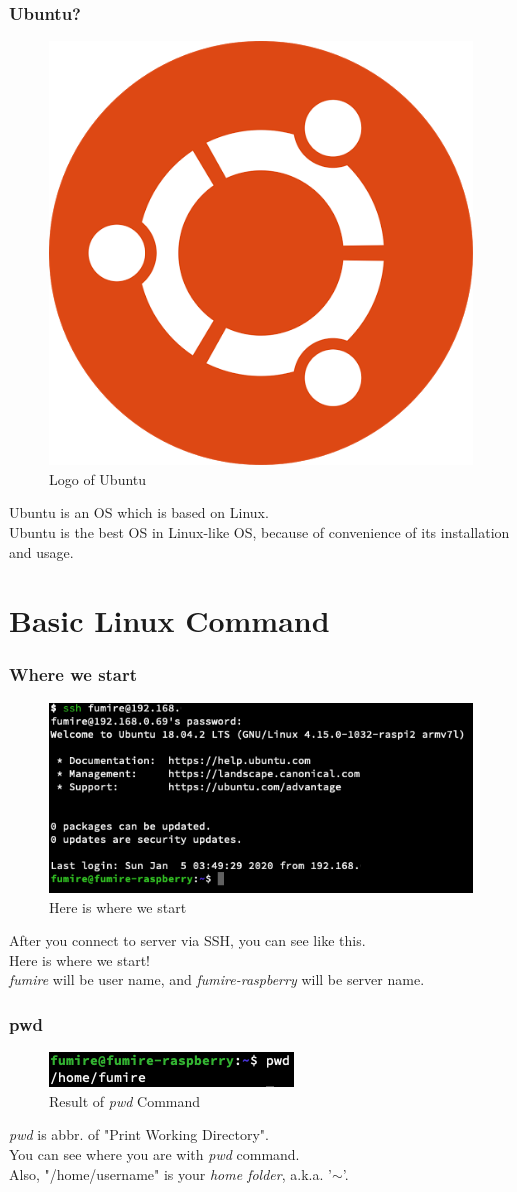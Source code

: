 \documentclass{beamer}
\begin{document}
	\begin{frame}
		\frametitle{Ubuntu?}
		\begin{figure}[h!]
			\centering
			\includegraphics[width=0.3 \linewidth]{figures/ubuntu.jpg}
			\caption{Logo of Ubuntu}
		\end{figure}
		Ubuntu is an OS which is based on Linux. \\
		Ubuntu is the best OS in Linux-like OS, because of convenience of its installation and usage.
	\end{frame}
	
	\section{Basic Linux Command}
	
	\begin{frame}
		\frametitle{Where we start}
		\begin{figure}[h!]
			\centering
			\includegraphics[width=0.5 \linewidth]{figures/1.png}
			\caption{Here is where we start}
		\end{figure}
	
		After you connect to server via SSH, you can see like this. \\
		Here is where we start! \\
		\textit{fumire} will be user name, and \textit{fumire-raspberry} will be server name. 
	\end{frame}

	\begin{frame}
		\frametitle{pwd}
		\begin{figure}[h!]
			\centering
			\includegraphics[width=0.5 \linewidth]{figures/2.png}
			\caption{Result of \textit{pwd} Command}
		\end{figure}
		\textit{pwd} is abbr. of "Print Working Directory". \\
		You can see where you are with \textit{pwd} command. \\
		Also, "/home/username" is your \textit{home folder}, a.k.a. '$\sim$'.
	\end{frame}
\end{document}
